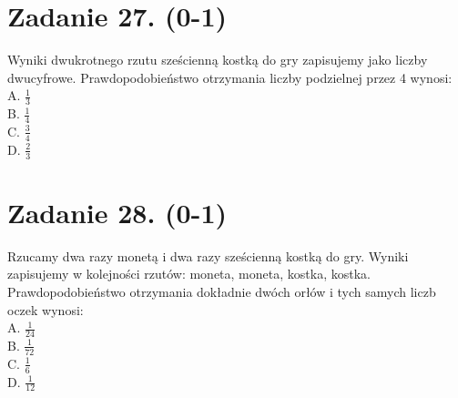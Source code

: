 \documentclass[10pt]{article}
\begin{document}
\section*{Zadanie 27. (0-1)}
Wyniki dwukrotnego rzutu sześcienną kostką do gry zapisujemy jako liczby dwucyfrowe. Prawdopodobieństwo otrzymania liczby podzielnej przez 4 wynosi:\\
A. \(\frac{1}{3}\)\\
B. \(\frac{1}{4}\)\\
C. \(\frac{3}{4}\)\\
D. \(\frac{2}{3}\)

\section*{Zadanie 28. (0-1)}
Rzucamy dwa razy monetą i dwa razy sześcienną kostką do gry. Wyniki zapisujemy w kolejności rzutów: moneta, moneta, kostka, kostka. Prawdopodobieństwo otrzymania dokładnie dwóch orłów i tych samych liczb oczek wynosi:\\
A. \(\frac{1}{24}\)\\
B. \(\frac{1}{72}\)\\
C. \(\frac{1}{6}\)\\
D. \(\frac{1}{12}\)
\end{document}
